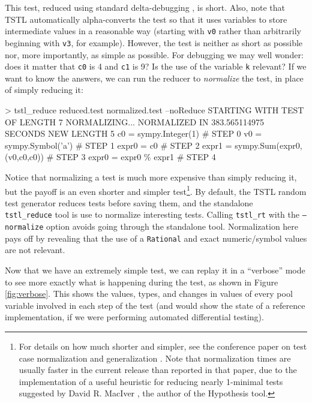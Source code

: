 This test, reduced using standard delta-debugging \cite{DD}, is
short.  Also, note that TSTL automatically alpha-converts the test so
that it uses variables to store intermediate values in a reasonable
way (starting with {\tt v0} rather than arbitrarily beginning with
{\tt v3}, for example).  However, the test is neither as short as possible nor, more
importantly, as simple as possible.  For debugging we may well wonder:
does it matter that {\tt c0} is 4 and {\tt c1} is 9?  Is the use of
the variable {\tt k} relevant?  If we want to know the answers, we can
run the reducer to \emph{normalize} \cite{OneTest} the test, in place
of simply reducing it:

{\scriptsize
\begin{code}
 > tstl\_reduce reduced.test normalized.test --noReduce
 STARTING WITH TEST OF LENGTH 7
 NORMALIZING...
 NORMALIZED IN 383.565114975 SECONDS
 NEW LENGTH 5
 c0 = sympy.Integer(1)                            \# STEP 0
 v0 = sympy.Symbol('a')                           \# STEP 1
 expr0 = c0                                       \# STEP 2
 expr1 = sympy.Sum(expr0,(v0,c0,c0))              \# STEP 3
 expr0 = expr0 \% expr1                            \# STEP 4
\end{code}
}

Notice that normalizing a test is much more expensive than simply
reducing it, but the payoff is an even shorter and simpler
test\footnote{For details on how much shorter and simpler, see the
  conference paper on test case normalization and generalization
  \cite{OneTest}.  Note that normalization times are usually faster in
the current release than reported in that paper, due to the
implementation of a useful heuristic for reducing nearly 1-minimal
tests suggested by David R. MacIver \cite{MacIver}, the author of the Hypothesis tool.}.  By default, the TSTL random test generator
reduces tests before saving them, and the standalone {\tt
  tstl\_reduce} tool is use to normalize interesting tests.  Calling
{\tt tstl\_rt} with the {\tt --normalize} option avoids going through
the standalone tool.  Normalization here pays off by revealing that
the use of a {\tt Rational} and exact numeric/symbol values are not
relevant.  

Now that we have an extremely simple test, we can replay it in a
``verbose'' mode to see more exactly what is happening during the test, as shown in
Figure \ref{fig:verbose}.  This shows the values, types, and changes
in values of every pool variable involved in each step of the test
(and would show the state of a reference implementation, if we were
performing automated differential testing).

